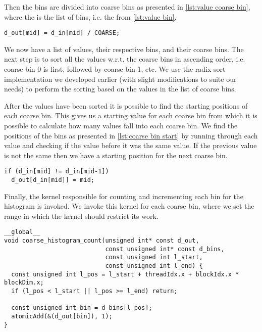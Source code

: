 Then the bins are divided into coarse bins as presented in \cref{lst:value coarse bin}, where the  is the list of bins, i.e. the  from \cref{lst:value bin}.

\begin{lstlisting}[caption={compute each value's coarse bin}, label={lst:value coarse bin}, numbers=none]
d_out[mid] = d_in[mid] / COARSE;
\end{lstlisting}

We now have a list of values, their respective bins, and their coarse bins.
The next step is to sort all the values w.r.t. the coarse bins in ascending order, i.e. coarse bin 0 is first, followed by coarse bin 1, etc.
We use the radix sort implementation we developed earlier (with slight modifications to suite our needs) to perform the sorting based on the values in the list of coarse bins.

After the values have been sorted it is possible to find the starting positions of each coarse bin.
This gives us a starting value for each coarse bin from which it is possible to calculate how many values fall into each coarse bin.
We find the positions of the bins as presented in \cref{lst:coarse bin start} by running through each value and checking if the value before it was the same value.
If the previous value is not the same then we have a starting position for the next coarse bin.

\begin{lstlisting}[caption={find the start positions of each coarse bin}, label={lst:coarse bin start}, numbers=none]
if (d_in[mid] != d_in[mid-1])
  d_out[d_in[mid]] = mid;
\end{lstlisting}

Finally, the kernel responsible for counting and incrementing each bin for the histogram is invoked.
We invoke this kernel for each coarse bin, where we set the range in which the kernel should restrict its work.

\begin{lstlisting}[caption={kernel to do histogram count for each coarse bin}, label={lst:coarse histo kernel}]
__global__
void coarse_histogram_count(unsigned int* const d_out,
                            const unsigned int* const d_bins,
                            const unsigned int l_start,
                            const unsigned int l_end) {
  const unsigned int l_pos = l_start + threadIdx.x + blockIdx.x * blockDim.x;
  if (l_pos < l_start || l_pos >= l_end) return;

  const unsigned int bin = d_bins[l_pos];
  atomicAdd(&(d_out[bin]), 1);
}
\end{lstlisting}


